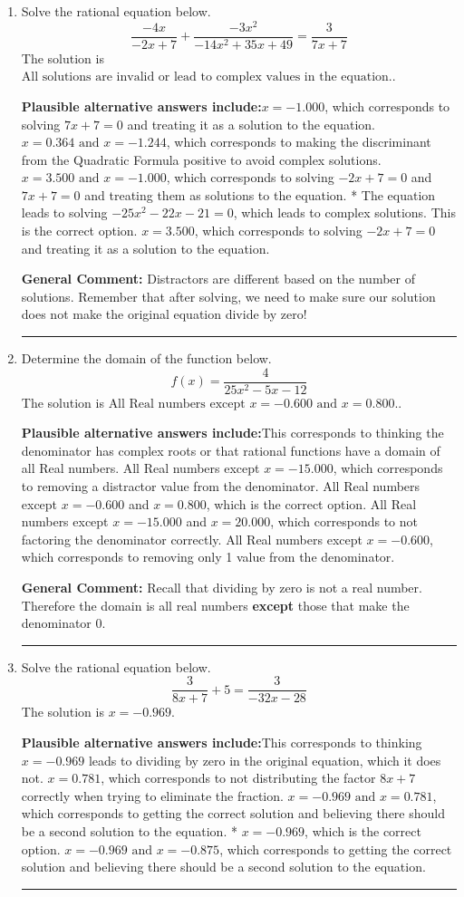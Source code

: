 \documentclass{extbook}[14pt]
\newcommand{\litem}[1]{\item #1

\rule{\textwidth}{0.4pt}}
\begin{document}
\begin{enumerate}\litem{
Solve the rational equation below.
\[ \frac{-4x}{-2x + 7} + \frac{-3x^{2}}{-14x^{2} +35 x + 49} = \frac{3}{7x + 7} \]The solution is \( \text{All solutions are invalid or lead to complex values in the equation.} \).\begin{enumerate}[label=\Alph*.]
\textbf{Plausible alternative answers include:}$x = -1.000$, which corresponds to solving $7x + 7 = 0$ and treating it as a solution to the equation.
$x = 0.364 \text{ and } x = -1.244$, which corresponds to making the discriminant from the Quadratic Formula positive to avoid complex solutions.
$x = 3.500 \text{ and } x = -1.000$, which corresponds to solving $-2x + 7 = 0$ and $7x + 7 = 0$ and treating them as solutions to the equation.
* The equation leads to solving $-25x^{2} -22 x -21=0$, which leads to complex solutions. This is the correct option.
$x = 3.500$, which corresponds to solving $-2x + 7 = 0$ and treating it as a solution to the equation.
\end{enumerate}

\textbf{General Comment:} Distractors are different based on the number of solutions. Remember that after solving, we need to make sure our solution does not make the original equation divide by zero!
}
\litem{
Determine the domain of the function below.
\[ f(x) = \frac{4}{25x^{2} -5 x -12} \]The solution is \( \text{All Real numbers except } x = -0.600 \text{ and } x = 0.800. \).\begin{enumerate}[label=\Alph*.]
\textbf{Plausible alternative answers include:}This corresponds to thinking the denominator has complex roots or that rational functions have a domain of all Real numbers.
All Real numbers except $x = -15.000$, which corresponds to removing a distractor value from the denominator.
All Real numbers except $x = -0.600$ and $x = 0.800$, which is the correct option.
All Real numbers except $x = -15.000$ and $x = 20.000$, which corresponds to not factoring the denominator correctly.
All Real numbers except $x = -0.600$, which corresponds to removing only 1 value from the denominator.
\end{enumerate}

\textbf{General Comment:} Recall that dividing by zero is not a real number. Therefore the domain is all real numbers \textbf{except} those that make the denominator 0.
}
\litem{
Solve the rational equation below.
\[ \frac{3}{8x + 7} + 5 = \frac{3}{-32x -28} \]The solution is \( x = -0.969 \).\begin{enumerate}[label=\Alph*.]
\textbf{Plausible alternative answers include:}This corresponds to thinking $x = -0.969$ leads to dividing by zero in the original equation, which it does not.
$x = 0.781$, which corresponds to not distributing the factor $8x + 7$ correctly when trying to eliminate the fraction.
$x = -0.969 \text{ and } x = 0.781$, which corresponds to getting the correct solution and believing there should be a second solution to the equation.
* $x = -0.969$, which is the correct option.
$x = -0.969 \text{ and } x = -0.875$, which corresponds to getting the correct solution and believing there should be a second solution to the equation.
\end{enumerate}

}
\end{enumerate}
\end{document}

